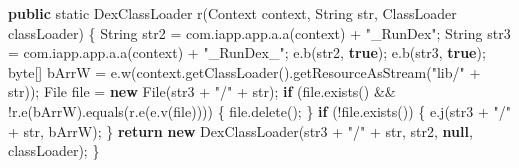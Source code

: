 \documentclass[
]{article}
\newenvironment{Shaded}{}{}
\newcommand{\BuiltInTok}[1]{\textcolor[rgb]{0.00,0.50,0.00}{#1}}
\newcommand{\ControlFlowTok}[1]{\textcolor[rgb]{0.00,0.44,0.13}{\textbf{#1}}}
\newcommand{\DataTypeTok}[1]{\textcolor[rgb]{0.56,0.13,0.00}{#1}}
\newcommand{\FunctionTok}[1]{\textcolor[rgb]{0.02,0.16,0.49}{#1}}
\newcommand{\KeywordTok}[1]{\textcolor[rgb]{0.00,0.44,0.13}{\textbf{#1}}}
\newcommand{\NormalTok}[1]{#1}
\newcommand{\OperatorTok}[1]{\textcolor[rgb]{0.40,0.40,0.40}{#1}}
\newcommand{\StringTok}[1]{\textcolor[rgb]{0.25,0.44,0.63}{#1}}
\begin{document}
\begin{Shaded}
\begin{Highlighting}[]
    \KeywordTok{public} \DataTypeTok{static}\NormalTok{ DexClassLoader }\FunctionTok{r}\OperatorTok{(}\BuiltInTok{Context}\NormalTok{ context}\OperatorTok{,} \BuiltInTok{String}\NormalTok{ str}\OperatorTok{,} \BuiltInTok{ClassLoader}\NormalTok{ classLoader}\OperatorTok{)} \OperatorTok{\{}
        \BuiltInTok{String}\NormalTok{ str2 }\OperatorTok{=}\NormalTok{ com}\OperatorTok{.}\FunctionTok{iapp}\OperatorTok{.}\FunctionTok{app}\OperatorTok{.}\FunctionTok{a}\OperatorTok{.}\FunctionTok{a}\OperatorTok{(}\NormalTok{context}\OperatorTok{)} \OperatorTok{+} \StringTok{"\_RunDex"}\OperatorTok{;}
        \BuiltInTok{String}\NormalTok{ str3 }\OperatorTok{=}\NormalTok{ com}\OperatorTok{.}\FunctionTok{iapp}\OperatorTok{.}\FunctionTok{app}\OperatorTok{.}\FunctionTok{a}\OperatorTok{.}\FunctionTok{a}\OperatorTok{(}\NormalTok{context}\OperatorTok{)} \OperatorTok{+} \StringTok{"\_RunDex\_"}\OperatorTok{;}
\NormalTok{        e}\OperatorTok{.}\FunctionTok{b}\OperatorTok{(}\NormalTok{str2}\OperatorTok{,} \KeywordTok{true}\OperatorTok{);}
\NormalTok{        e}\OperatorTok{.}\FunctionTok{b}\OperatorTok{(}\NormalTok{str3}\OperatorTok{,} \KeywordTok{true}\OperatorTok{);}
        \DataTypeTok{byte}\OperatorTok{[]}\NormalTok{ bArrW }\OperatorTok{=}\NormalTok{ e}\OperatorTok{.}\FunctionTok{w}\OperatorTok{(}\NormalTok{context}\OperatorTok{.}\FunctionTok{getClassLoader}\OperatorTok{().}\FunctionTok{getResourceAsStream}\OperatorTok{(}\StringTok{"lib/"} \OperatorTok{+}\NormalTok{ str}\OperatorTok{));}
        \BuiltInTok{File}\NormalTok{ file }\OperatorTok{=} \KeywordTok{new} \BuiltInTok{File}\OperatorTok{(}\NormalTok{str3 }\OperatorTok{+} \StringTok{"/"} \OperatorTok{+}\NormalTok{ str}\OperatorTok{);}
        \ControlFlowTok{if} \OperatorTok{(}\NormalTok{file}\OperatorTok{.}\FunctionTok{exists}\OperatorTok{()} \OperatorTok{\&\&} \OperatorTok{!}\NormalTok{r}\OperatorTok{.}\FunctionTok{e}\OperatorTok{(}\NormalTok{bArrW}\OperatorTok{).}\FunctionTok{equals}\OperatorTok{(}\NormalTok{r}\OperatorTok{.}\FunctionTok{e}\OperatorTok{(}\NormalTok{e}\OperatorTok{.}\FunctionTok{v}\OperatorTok{(}\NormalTok{file}\OperatorTok{))))} \OperatorTok{\{}
\NormalTok{            file}\OperatorTok{.}\FunctionTok{delete}\OperatorTok{();}
        \OperatorTok{\}}
        \ControlFlowTok{if} \OperatorTok{(!}\NormalTok{file}\OperatorTok{.}\FunctionTok{exists}\OperatorTok{())} \OperatorTok{\{}
\NormalTok{            e}\OperatorTok{.}\FunctionTok{j}\OperatorTok{(}\NormalTok{str3 }\OperatorTok{+} \StringTok{"/"} \OperatorTok{+}\NormalTok{ str}\OperatorTok{,}\NormalTok{ bArrW}\OperatorTok{);}
        \OperatorTok{\}}
        \ControlFlowTok{return} \KeywordTok{new} \FunctionTok{DexClassLoader}\OperatorTok{(}\NormalTok{str3 }\OperatorTok{+} \StringTok{"/"} \OperatorTok{+}\NormalTok{ str}\OperatorTok{,}\NormalTok{ str2}\OperatorTok{,} \KeywordTok{null}\OperatorTok{,}\NormalTok{ classLoader}\OperatorTok{);}
    \OperatorTok{\}}


\end{Highlighting}
\end{Shaded}
\end{document}
